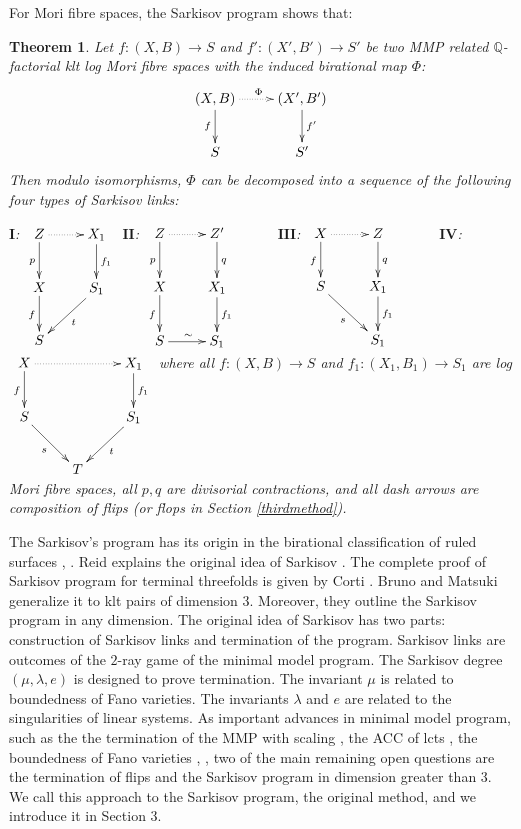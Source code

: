 \documentclass[11pt]{amsart}
\newtheorem{thm}[defn]{Theorem}
\begin{document}
For Mori fibre spaces, the Sarkisov program shows that:
\begin{thm}\label{main}
  Let $ f:(X,B)\to S$ and $f':(X',B')\to S' $ be two MMP related $ \mathbb{Q} $-factorial klt log Mori fibre spaces with the induced  birational map $\Phi$:
  \[ \xymatrix{
    (X,B)\ar[d]_f\ar@{.>}[r]^\Phi&(X',B')\ar[d]^{f'}\\
    S&S'} \]
  Then modulo isomorphisms, $ \Phi  $ can be decomposed into a sequence of the following four types of Sarkisov links:


  $\textbf{I}$:
  $\xymatrix{
    Z\ar[d]_p\ar@{.>}[r]&X_1\ar[d]^{f_1}\\
    X\ar[d]_f&S_1\ar[dl]^{t}\\
  S &}$
  $\textbf{II}$:
  $\xymatrix{
    Z\ar[d]_p\ar@{.>}[r]&Z'\ar[d]^{q}&\\
    X\ar[d]_{f}&X_1\ar[d]^{f_1}\\
    S\ar[r]^{\sim}&S_1}$
  $\textbf{III}$:
  $
  \xymatrix{
    X\ar@{.>}[r]\ar[d]_f& Z\ar[d]^q& \\
    S\ar[rd]_{s}         & X_{1}\ar[d]^{f_{1}}&\\
    &S_{1}
  }
  $
  $\textbf{IV}$:
  $\xymatrix{
    X\ar[d]_f\ar@{.>}[rr]&&X_1\ar[d]^{f_1}\\
    S\ar[dr]_{s}&&S_1\ar[dl]^{t}\\
    &T &}$
    where all $ f:(X,B)\to S $ and $ f_1:(X_1,B_1)\to S_1 $ are log Mori fibre spaces, all $ p,q $ are divisorial contractions, and all dash arrows are composition of flips (or flops in Section \ref{thirdmethod}). 
  \end{thm}

The Sarkisov's program has its origin in the birational classification of ruled surfaces \cite{sarkisovBIRATIONALAUTOMORPHISMSCONIC1981}, \cite{sarkisovCONICBUNDLESTRUCTURES1983}. 
Reid \cite{reidBirationalgeometry} explains the original idea of Sarkisov \cite{sarkisovBirationalmapsofstandardQfanoFibering}. 
The complete proof of Sarkisov program for terminal threefolds is given  by Corti \cite{cortiFactoringBirationalMaps}. 
Bruno and Matsuki \cite{brunoLogSarkisovProgram1995} generalize it to klt pairs of dimension $3$. Moreover, they outline the Sarkisov program in any dimension. The original idea of Sarkisov has two parts: construction of Sarkisov links and termination of the program. Sarkisov links are outcomes of the $2$-ray game of  the minimal model program. The Sarkisov degree $(\mu,\lambda, e)$ is designed to prove termination. The invariant $\mu$ is related to boundedness of Fano varieties. The invariants $\lambda$ and $e$ are related to the singularities of linear systems.
As important advances in minimal model program, such as the the termination of the MMP with scaling \cite{BCHM10}, the ACC of lcts \cite{HMX14}, the boundedness of Fano varieties \cite{Bir19}, \cite{birkarSingularitiesLinearSystems2020},   two of the main remaining  open questions are the termination of flips and the  Sarkisov program in dimension greater than 3. We call this approach to the Sarkisov program, the original method, and we introduce it in Section 3.
\end{document}
